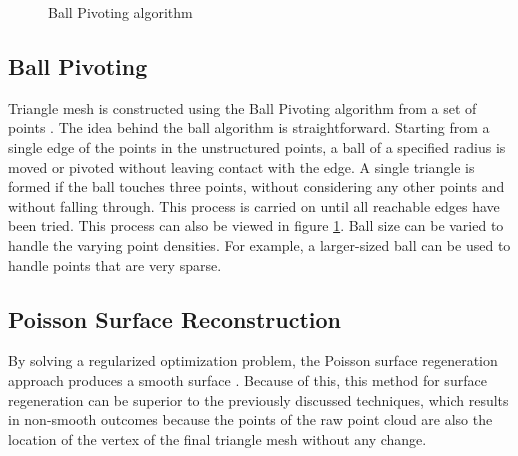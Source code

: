 \begin{figure}[htbp]
\begin{minipage}[b]{0.45\textwidth}
    \caption{Ball Pivoting algorithm \parencite{bernardini1999ball}}
    \label{fig:related_work-ball_piv_3}
    \end{minipage}
\end{figure}


\subsection{Ball Pivoting}
Triangle mesh is constructed using the Ball Pivoting algorithm from a set of points \parencite{bernardini1999ball}. The idea behind the ball algorithm is straightforward. Starting from a single edge of the points in the unstructured points, a ball of a specified radius is moved or pivoted without leaving contact with the edge. A single triangle is formed if the ball touches three points, without considering any other points and without falling through. This process is carried on until all reachable edges have been tried. This process can also be viewed in figure \ref{fig:related_work-ball_piv_3}. Ball size can be varied to handle the varying point densities. For example, a larger-sized ball can be used to handle points that are very sparse.

\subsection{Poisson Surface Reconstruction}
By solving a regularized optimization problem, the Poisson surface regeneration approach produces a smooth surface \parencite{kazhdan2006poisson}. Because of this, this method for surface regeneration can be superior to the previously discussed techniques, which results in non-smooth outcomes because the points of the raw point cloud are also the location of the vertex of the final triangle mesh without any change. 

